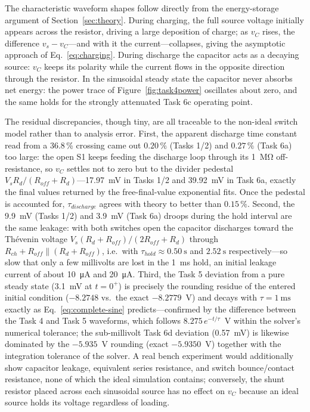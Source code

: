 \documentclass[12pt,a4paper]{article}
\begin{document}
	The characteristic waveform shapes follow directly from the
	energy-storage argument of Section~\ref{sec:theory}.  During charging, the full
	source voltage initially appears across the resistor, driving a
	large deposition of charge; as $v_C$ rises, the difference
	$v_s - v_C$---and with it the current---collapses, giving the
	asymptotic approach of Eq.~\eqref{eq:charging}.  During discharge
	the capacitor acts as a decaying source: $v_C$ keeps its polarity
	while the current flows in the opposite direction through the
	resistor.  In the sinusoidal steady state the capacitor never
	absorbs net energy: the power trace of Figure~\ref{fig:task4power}
	oscillates about zero, and the same holds for the strongly
	attenuated Task 6c operating point.
	
	The residual discrepancies, though tiny, are all traceable to the
	non-ideal switch model rather than to analysis error.  First, the
	apparent discharge time constant read from a 36.8\,\% crossing came
	out $0.20\,\%$ (Tasks 1/2) and $0.27\,\%$ (Task 6a) too large: the
	open S1 keeps feeding the discharge loop through its
	\SI{1}{\mega\ohm} off-resistance, so $v_C$ settles not to zero but
	to the divider pedestal $V_s R_d/(R_{off}+R_d)$---\SI{17.97}{\milli\volt} in
	Tasks 1/2 and \SI{39.92}{\milli\volt} in Task 6a, exactly the final values
	returned by the free-final-value exponential fits.  Once the
	pedestal is accounted for, $\tau_{discharge}$ agrees with theory to
	better than $0.15\,\%$.  Second, the \SI{9.9}{\milli\volt}
	(Tasks 1/2) and \SI{3.9}{\milli\volt} (Task 6a) droops during the
	hold interval are the same leakage: with both switches open the
	capacitor discharges toward the Th\'evenin voltage
	$V_s(R_d + R_{off})/(2R_{off} + R_d)$ through
	$R_{ch} + R_{off} \parallel (R_d + R_{off})$, i.e.\ with
	$\tau_{hold} \approx \SI{0.50}{\second}$ and
	$\SI{2.52}{\second}$ respectively---so slow that only a few
	millivolts are lost in the \SI{1}{\milli\second} hold, an initial
	leakage current of about \SI{10}{\micro\ampere} and
	\SI{20}{\micro\ampere}.  Third, the Task 5 deviation from a pure
	steady state (\SI{3.1}{\milli\volt} at $t = 0^{+}$) is precisely the
	rounding residue of the entered initial condition ($-8.2748$ vs.\
	the exact $-8.2779$~V) and decays with $\tau =
	\SI{1}{\milli\second}$ exactly as Eq.~\eqref{eq:complete-sine}
	predicts---confirmed by the difference between the Task 4 and Task 5
	waveforms, which follows $8.275\,e^{-t/\tau}$~\si{\volt} within the solver's
	numerical tolerance; the sub-millivolt Task 6d deviation
	(\SI{0.57}{\milli\volt}) is likewise dominated by the $-5.935$~V
	rounding (exact $-5.9350$~V) together with the integration tolerance
	of the solver.  A real bench experiment would additionally show
	capacitor leakage, equivalent series resistance, and switch
	bounce/contact resistance, none of which the ideal simulation
	contains; conversely, the shunt resistor placed across each
	sinusoidal source has no effect on $v_C$ because an ideal source
	holds its voltage regardless of loading.
	
\end{document}
